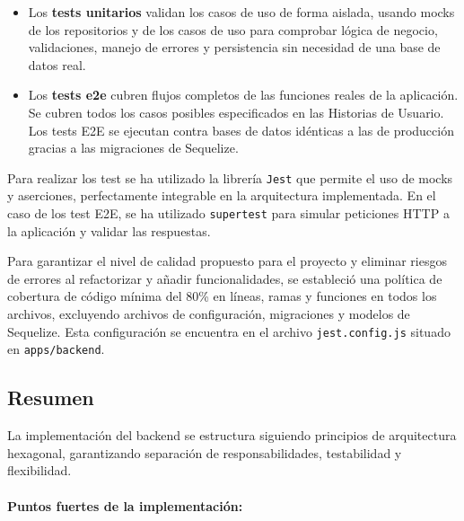 \begin{itemize}
  
\item Los \textbf{tests unitarios} validan los casos de uso de forma aislada, usando mocks de los repositorios y de los casos de uso 
para comprobar lógica de negocio, validaciones, manejo de errores y persistencia sin necesidad de una base de datos real.


\item Los \textbf{tests e2e} cubren flujos completos de las funciones reales de la aplicación. 
Se cubren todos los casos posibles especificados en las Historias de Usuario. Los tests E2E se ejecutan contra bases de datos
idénticas a las de producción gracias a las migraciones de Sequelize. 
\end{itemize}

Para realizar los test se ha utilizado la librería \texttt{Jest} que permite el uso de mocks y aserciones, perfectamente 
integrable en la arquitectura implementada. En el caso de los test E2E, se ha utilizado \texttt{supertest} para simular 
peticiones HTTP a la aplicación y validar las respuestas. 

Para garantizar el nivel de calidad propuesto para el proyecto y eliminar riesgos de errores al refactorizar y añadir funcionalidades, se estableció una política de cobertura de código mínima del 80\% en líneas, ramas y funciones en todos los archivos,
excluyendo archivos de configuración, migraciones y modelos de Sequelize. Esta configuración se encuentra en el archivo \texttt{jest.config.js}
situado en \texttt{apps/backend}.

\subsection{Resumen}

La implementación del backend se estructura siguiendo principios de arquitectura hexagonal, garantizando 
separación de responsabilidades, testabilidad y flexibilidad.

\paragraph{Puntos fuertes de la implementación:}

